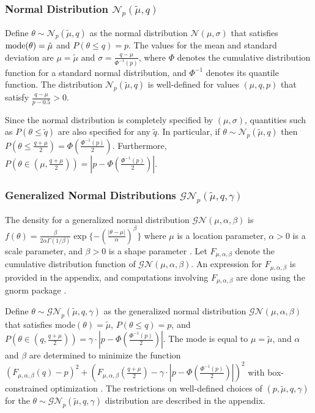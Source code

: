 \documentclass[useAMS,usenatbib,referee]{biom}
\begin{document}
\subsubsection{Normal Distribution $\mathcal{N}_p(\tilde{\mu},q)$}

Define $\theta\sim\mathcal{N}_p(\tilde{\mu},q)$ as the normal distribution $\mathcal{N}(\mu,\sigma)$ that satisfies ${\mathrm{mode}}(\theta)=\tilde{\mu}$ and $P(\theta\leq q)=p$.
%
The values for the mean and standard deviation are $\mu=\tilde{\mu}$ and $\sigma=\frac{q-\mu}{\Phi^{-1}(p)}$, where $\Phi$ denotes the cumulative distribution function for a standard normal distribution, and $\Phi^{-1}$ denotes its quantile function. The distribution $\mathcal{N}_p(\tilde{\mu},q)$ is well-defined for values $(\mu,q,p)$ that satisfy $\frac{q-\mu}{p-0.5}>0$.


 Since the normal distribution is completely specified by $(\mu, \sigma)$, quantities such as $P(\theta\leq\tilde{q})$ are also specified for any $\tilde{q}$. In particular, if $\theta\sim\mathcal{N}_p(\tilde{\mu},q)$ then $P(\theta\leq\frac{q+\mu}{2})=\Phi(\frac{\Phi^{-1}(p)}{2})$. Furthermore, $P(\theta\in(\mu,\frac{q+\mu}{2}))=|p-\Phi(\frac{\Phi^{-1}(p)}{2})|$. 

\subsubsection{Generalized Normal Distributions $\mathcal{GN}_p(\tilde{\mu},q,\gamma)$}
The density for a generalized normal distribution $\mathcal{GN}(\mu,\alpha,\beta)$ is
$
f(\theta)=\frac{\beta}{2\alpha\Gamma(1/\beta)}\exp\{-(\frac{|\theta-\mu|}{\alpha})^\beta\}
$ where $\mu$ is a location parameter, $\alpha>0$ is a scale parameter, and $\beta>0$ is a shape parameter \citep{Nadarajah2005}. Let $F_{\mu,\alpha,\beta}$ denote the cumulative distribution function of $\mathcal{GN}(\mu,\alpha,\beta)$. An expression for $F_{\mu,\alpha,\beta}$ is provided in the appendix, and computations involving $F_{\mu,\alpha,\beta}$ are done using the gnorm package \citep{Griffin2018}.

Define $\theta\sim\mathcal{GN}_p(\tilde{\mu},q,\gamma)$ as the generalized normal distribution $\mathcal{GN}(\mu,\alpha,\beta)$ that satisfies mode$(\theta)=\tilde{\mu}$, $P(\theta\leq q)=p$, and $P(\theta\in(q,\frac{q+\mu}{2}))=\gamma\cdot|p-\Phi(\frac{\Phi^{-1}(p)}{2})|$.
%
The mode is equal to $\mu=\tilde{\mu}$, and $\alpha$ and $\beta$ are determined to minimize the function $(F_{\mu,\alpha,\beta}(q)-p)^2+(F_{\mu,\alpha,\beta}(\frac{q+\mu}{2})-\gamma\cdot|p-\Phi(\frac{\Phi^{-1}(p)}{2})|)^2$ with box-constrained optimization \citep{Byrd1995}. The restrictions on well-defined choices of $(p,\tilde{\mu},q,\gamma)$ for the $\theta\sim\mathcal{GN}_p(\tilde{\mu},q,\gamma)$ distribution are described in the appendix.
\end{document}
